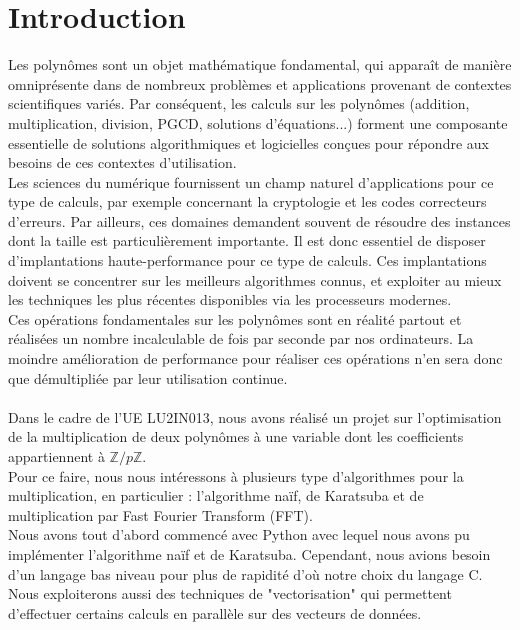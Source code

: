 \documentclass[12pt, a4paper]{article}
\begin{document}
\tableofcontents
\newpage

\section*{Introduction}

Les polynômes sont un objet mathématique fondamental, qui apparaît de manière omniprésente dans de nombreux problèmes et applications provenant de contextes scientifiques variés. Par conséquent, les calculs sur les polynômes (addition, multiplication, division, PGCD, solutions d’équations...) forment une composante essentielle de solutions algorithmiques et logicielles conçues pour répondre aux besoins de ces contextes d’utilisation. \\
\indent Les sciences du numérique fournissent un champ naturel d’applications pour ce type de calculs, par exemple concernant la cryptologie et les codes correcteurs d’erreurs. Par ailleurs, ces domaines demandent souvent de résoudre des instances dont la taille est particulièrement importante. Il est donc essentiel de disposer d’implantations haute-performance pour ce type de calculs. Ces implantations doivent se concentrer sur les meilleurs algorithmes connus, et exploiter au mieux les techniques les plus récentes disponibles via les processeurs modernes. \\
\indent Ces opérations fondamentales sur les polynômes sont en réalité partout et réalisées un nombre incalculable de fois par seconde par nos ordinateurs. La moindre amélioration de performance pour réaliser ces opérations n'en sera donc que démultipliée par leur utilisation continue. \\
\ \\
\indent Dans le cadre de l'UE LU2IN013, nous avons réalisé un projet sur l'optimisation de la multiplication de deux polynômes à une variable dont les coefficients appartiennent à $\mathbb{Z}/p\mathbb{Z}$. \\
\indent Pour ce faire, nous nous intéressons à plusieurs type d'algorithmes pour la multiplication, en particulier : l'algorithme naïf, de Karatsuba et de multiplication par Fast Fourier Transform (FFT).\\
\indent Nous avons tout d'abord commencé avec Python avec lequel nous avons pu implémenter l'algorithme naïf et de Karatsuba. Cependant,  nous avions besoin d'un langage bas niveau pour plus de rapidité d'où notre choix du langage C. \\
\indent Nous exploiterons aussi des techniques de "vectorisation" qui permettent d’effectuer certains calculs en parallèle sur des vecteurs de données.
\end{document}
